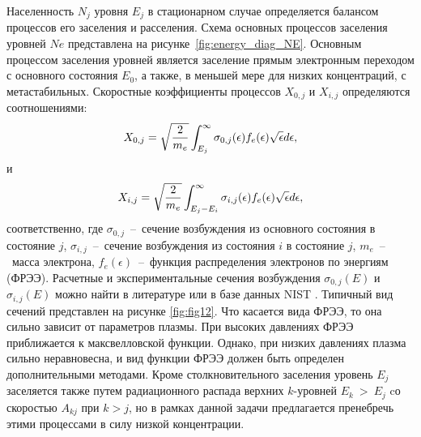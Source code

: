 Населенность $N_j$ уровня $E_j$ в стационарном случае определяется балансом процессов его заселения
и расселения. Схема основных процессов заселения уровней $Ne$ представлена на рисунке~\ref{fig:energy_diag_NE}.
Основным процессом заселения уровней является заселение прямым
электронным переходом с основного состояния $E_0$, а также, в меньшей мере для низких концентраций, с метастабильных.
Скоростные коэффициенты процессов $X_{0,j}$ и $X_{i,j}$ определяются соотношениями:
\begin{equation}
    X_{0,j} = \sqrt{2 \over m_e} \int_{E_j}^{\infty} \sigma_{0,j}(\epsilon) f_e(\epsilon) \sqrt{\epsilon} d\epsilon,
    \label{eq:X_0j}
\end{equation}
и
\begin{equation}
    X_{i,j} = \sqrt{2 \over m_e} \int_{E_j - E_i}^{\infty} \sigma_{i,j}(\epsilon) f_e(\epsilon) \sqrt{\epsilon} d\epsilon,
\end{equation}
соответственно, где $\sigma_{0,j}$~--~сечение возбуждения из основного состояния в состояние $j$,
$\sigma_{i,j}$~--~сечение возбуждения из состояния $i$ в состояние $j$, $m_e$~--~масса электрона, $f_e(\epsilon)$~--~функция
распределения электронов по энергиям (ФРЭЭ). Расчетные и экспериментальные сечения возбуждения $\sigma_{0,j}(E)$ и
$\sigma_{i,j}(E)$ можно найти в литературе или в базе данных NIST \cite{NIST}.
Типичный вид сечений представлен на рисунке \ref{fig:fig12}. Что касается вида ФРЭЭ, то она сильно зависит от параметров плазмы.
При высоких давлениях ФРЭЭ приближается к максвелловской функции. Однако, при низких давлениях плазма сильно неравновесна, и вид функции ФРЭЭ должен
быть определен дополнительными методами. Кроме столкновительного заселения уровень $E_j$ заселяется
также путем радиационного распада верхних $k$-уровней $E_k~>~E_j$ cо скоростью $A_{kj}$ при $k > j$, но в рамках данной задачи
предлагается пренебречь этими процессами в силу низкой концентрации.

